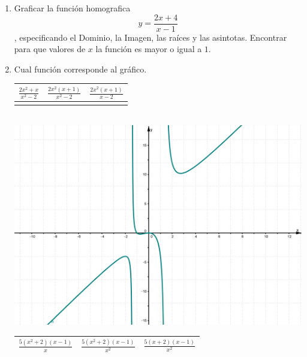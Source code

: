 \documentclass[a4paper,spanish]{exam}
\newcommand{\Ts}{\rule{0pt}{2.6ex}}       %
\newcommand{\Bs}{\rule[-1.2ex]{0pt}{0pt}} %
\begin{document}
\begin{enumerate}



\item Graficar la función homografica \[ y=\frac{2x+4}{x-1} \], especificando el Dominio, la Imagen, las raíces y las asintotas. Encontrar para que valores de $x$ la función es mayor o igual a $1$.


\item Cual función corresponde al gráfico. 

\begin{minipage}{0.5\textwidth}
\centering
\label{mc1}
\begin{tabular}{|c|c|c|}
\hline
$\frac{2x^2+x}{x^2-2}$  & $\frac{2x^2(x+1)}{x^2-2}$ & $\frac{2x^2(x+1)}{x-2}$ \Ts \Bs   \\ \hline
   &   &      \\ \hline
\end{tabular}\\
\centering
\includegraphics[width= 0.95\linewidth]{problematema1.png}
\end{minipage}
\begin{minipage}{.5\textwidth}
\centering
\begin{tabular}{|c|c|c|}
\hline
$\frac{5(x^2+2)(x-1)}{x}$  & $\frac{5(x^2+2)(x-1)}{x^2}$ & $\frac{5(x+2)(x-1)}{x^2}$ \Ts \Bs   \\ \hline

\end{tabular}
\end{minipage}
\end{enumerate}
\end{document}
